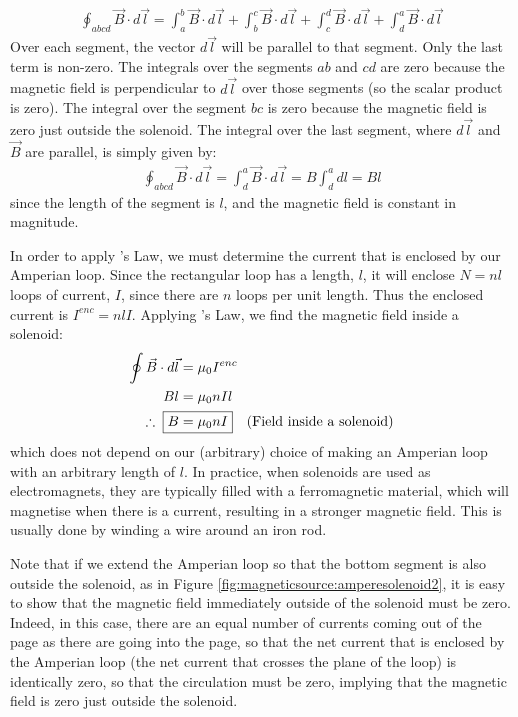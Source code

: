 \begin{align*}
\oint_{abcd} \vec B \cdot d\vec l = \int_a^b \vec B \cdot d\vec l + \int_b^c \vec B \cdot d\vec l + \int_c^d \vec B \cdot d\vec l + \int_d^a \vec B \cdot d\vec l 
\end{align*}
Over each segment, the vector $d\vec l$ will be parallel to that segment. Only the last term is non-zero. The integrals over the segments $ab$ and $cd$ are zero because the magnetic field is perpendicular to $d\vec l$ over those segments (so the scalar product is zero). The integral over the segment $bc$ is zero because the magnetic field is zero just outside the solenoid. The integral over the last segment, where $d\vec l$ and $\vec B$ are parallel, is simply given by:
\begin{align*}
\oint_{abcd} \vec B \cdot d\vec l = \int_d^a \vec B \cdot d\vec l = B \int_d^a dl = Bl
\end{align*}
since the length of the segment is $l$, and the magnetic field is constant in magnitude.

In order to apply \ampere's Law, we must determine the current that is enclosed by our Amperian loop. Since the rectangular loop has a length, $l$, it will enclose $N=nl$ loops of current, $I$, since there are $n$ loops per unit length. Thus the enclosed current is $I^{enc}=nlI$. Applying \ampere's Law, we find the magnetic field inside a solenoid:
\begin{align*}
\oint \vec B \cdot d\vec l &=\mu_0 I^{enc}\\
Bl &= \mu_0 nIl\\
\therefore\;\; \Aboxed{B &= \mu_0 nI}\quad \text{(Field inside a solenoid)}
\end{align*}
which does not depend on our (arbitrary) choice of making an Amperian loop with an arbitrary length of $l$. In practice, when solenoids are used as electromagnets, they are typically filled with a ferromagnetic material, which will magnetise when there is a current, resulting in a stronger magnetic field. This is usually done by winding a wire around an iron rod. 

Note that if we extend the Amperian loop so that the bottom segment is also outside the solenoid, as in Figure \ref{fig:magneticsource:amperesolenoid2}, it is easy to show that the magnetic field immediately outside of the solenoid must be zero. Indeed, in this case, there are an equal number of currents coming out of the page as there are going into the page, so that the net current that is enclosed by the Amperian loop (the net current that crosses the plane of the loop) is identically zero, so that the circulation must be zero, implying that the magnetic field is zero just outside the solenoid.


